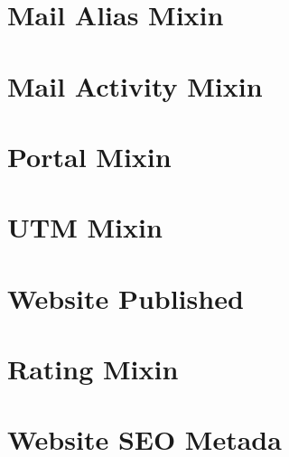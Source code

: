 \documentclass[letterpaper,10pt,spanish]{sphinxmanual}
\begin{document}
\section{Mail Alias Mixin}
\label{\detokenize{tecnico/mixin-models/mail-alias-mixin:mail-alias-mixin}}\label{\detokenize{tecnico/mixin-models/mail-alias-mixin:id1}}\label{\detokenize{tecnico/mixin-models/mail-alias-mixin::doc}}

\section{Mail Activity Mixin}
\label{\detokenize{tecnico/mixin-models/mail-activity-mixin:mail-activity-mixin}}\label{\detokenize{tecnico/mixin-models/mail-activity-mixin:id1}}\label{\detokenize{tecnico/mixin-models/mail-activity-mixin::doc}}

\section{Portal Mixin}
\label{\detokenize{tecnico/mixin-models/portal-mixin:portal-mixin}}\label{\detokenize{tecnico/mixin-models/portal-mixin:id1}}\label{\detokenize{tecnico/mixin-models/portal-mixin::doc}}

\section{UTM Mixin}
\label{\detokenize{tecnico/mixin-models/utm-mixin:utm-mixin}}\label{\detokenize{tecnico/mixin-models/utm-mixin:id1}}\label{\detokenize{tecnico/mixin-models/utm-mixin::doc}}

\section{Website Published}
\label{\detokenize{tecnico/mixin-models/website-published:website-published}}\label{\detokenize{tecnico/mixin-models/website-published:id1}}\label{\detokenize{tecnico/mixin-models/website-published::doc}}

\section{Rating Mixin}
\label{\detokenize{tecnico/mixin-models/rating-mixin:rating-mixin}}\label{\detokenize{tecnico/mixin-models/rating-mixin:id1}}\label{\detokenize{tecnico/mixin-models/rating-mixin::doc}}

\section{Website SEO Metada}
\label{\detokenize{tecnico/mixin-models/website-seo-metadata:website-seo-metada}}\label{\detokenize{tecnico/mixin-models/website-seo-metadata:id1}}\label{\detokenize{tecnico/mixin-models/website-seo-metadata::doc}}
\end{document}
